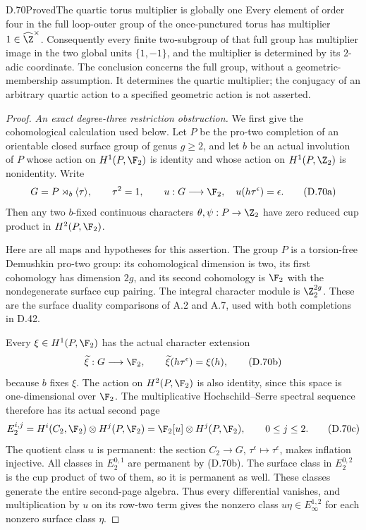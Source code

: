 \begin{claim}{D.70}{Proved}{The quartic torus multiplier is globally one}
Every element of order four in the full loop-outer group
of the once-punctured torus has multiplier
$1\in\widehat\Z^\times$.
Consequently every finite two-subgroup of that full group
has multiplier image in the two global units $\{1,-1\}$,
and the multiplier is determined by its $2$-adic coordinate.
The conclusion concerns the full group, without a
geometric-membership assumption.
It determines the quartic multiplier; the conjugacy of
an arbitrary quartic action to a specified geometric
action is not asserted.
\end{claim}
\begin{proof}
\emph{An exact degree-three restriction obstruction.}
We first give the cohomological calculation used below.
Let $P$ be the pro-two completion of an orientable closed
surface group of genus $g\geq2$, and let $b$ be an actual
involution of $P$ whose action on $H^1(P,\F_2)$ is
identity and whose action on $H^1(P,\Z_2)$ is nonidentity.
Write
\[
 G=P\rtimes_b\langle\tau\rangle,\qquad
 \tau^2=1,\qquad
 u:G\longrightarrow\F_2,\quad u(h\tau^\epsilon)=\epsilon .
                                                               \tag{D.70a}
\]
Then any two $b$-fixed continuous characters
$\theta,\psi:P\to\Z_2$ have zero reduced cup product
in $H^2(P,\F_2)$.

Here are all maps and hypotheses for this assertion.
The group $P$ is a torsion-free Demushkin pro-two group:
its cohomological dimension is two, its first cohomology
has dimension $2g$, and its second cohomology is
$\F_2$ with the nondegenerate surface cup pairing.
The integral character module is $\Z_2^{2g}$.
These are the surface duality comparisons of A.2 and A.7,
used with both completions in D.42.

Every $\xi\in H^1(P,\F_2)$ has the actual character
extension
\[
 \widetilde\xi:G\longrightarrow\F_2,\qquad
                  \widetilde\xi(h\tau^\epsilon)=\xi(h),
                                                               \tag{D.70b}
\]
because $b$ fixes $\xi$.
The action on $H^2(P,\F_2)$ is also identity, since this
space is one-dimensional over $\F_2$.
The multiplicative Hochschild--Serre spectral sequence
therefore has its actual second page
\[
 E_2^{i,j}
   =H^i(C_2,\F_2)\otimes H^j(P,\F_2)
   =\F_2[u]\otimes H^j(P,\F_2),\qquad 0\leq j\leq2 .
                                                               \tag{D.70c}
\]
The quotient class $u$ is permanent: the section
$C_2\to G$, $\tau^\epsilon\mapsto\tau^\epsilon$,
makes inflation injective.
All classes in $E_2^{0,1}$ are permanent by (D.70b).
The surface class in $E_2^{0,2}$ is the cup product of
two of them, so it is permanent as well.
These classes generate the entire second-page algebra.
Thus every differential vanishes, and multiplication by
$u$ on its row-two term gives the nonzero class
$u\eta\in E_\infty^{1,2}$ for each nonzero surface
class $\eta$.


\end{proof}
